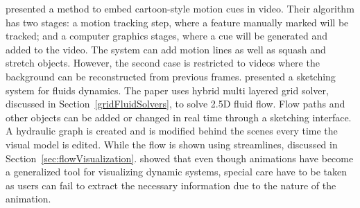 \cite{Collomosse2005} presented a method to embed cartoon-style motion cues in video.
Their algorithm has two stages: a motion tracking step, where a feature manually marked will be tracked; and a computer graphics stages, where a cue will be generated and added to the video.
The system can add motion lines as well as squash and stretch objects.
However, the second case is restricted to videos where the background can be reconstructed from previous frames.
\cite{Zhu2011} presented a sketching system for fluids dynamics.
The paper uses hybrid multi layered grid solver, discussed in Section~\ref{gridFluidSolvers}, to solve 2.5D fluid flow.
Flow paths and other objects can be added or changed in real time through a sketching interface.
A hydraulic graph is created and is modified behind the scenes every time the visual model is edited.
While the flow is shown using streamlines, discussed in Section~\ref{sec:flowVisualization}.
\cite{Lowe2014} showed that even though animations have become a generalized tool for visualizing dynamic systems, special care have to be taken as users can fail to extract the necessary information due to the nature of the animation.